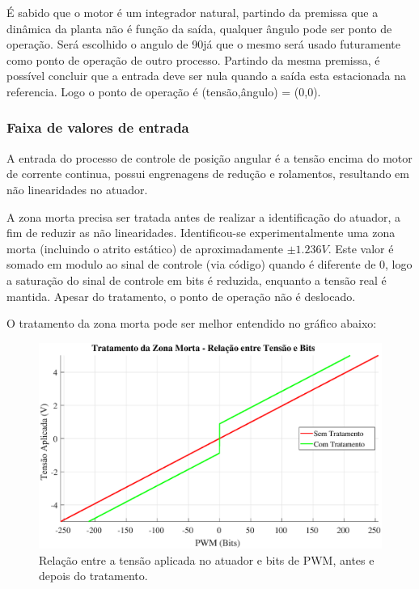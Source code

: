 \documentclass[conference,harvard,brazil,english]{sbatex}
\begin{document}
            É sabido que o motor é um integrador natural, partindo da premissa que a dinâmica da planta não é função da saída, qualquer ângulo pode ser ponto de operação. Será escolhido o angulo de 90\degree já que o mesmo será usado futuramente como ponto de operação de outro processo. Partindo da mesma premissa, é possível concluir que a entrada deve ser nula quando a saída esta estacionada na referencia. Logo o ponto de operação é (tensão,ângulo) = (0,0).
            
            \subsubsection{Faixa de valores de entrada}
                
                A entrada do processo de controle de posição angular é a tensão encima do motor de corrente continua, possui engrenagens de redução e rolamentos, resultando em não linearidades no atuador.
                
                A zona morta precisa ser tratada antes de realizar a identificação do atuador, a fim de reduzir as não linearidades. Identificou-se experimentalmente uma zona morta (incluindo o atrito estático) de aproximadamente $\pm 1.236V$. Este valor é somado em modulo ao sinal de controle (via código) quando é diferente de 0, logo a saturação do sinal de controle em bits é reduzida, enquanto a tensão real é mantida. Apesar do tratamento, o ponto de operação não é deslocado.
                
                O tratamento da zona morta pode ser melhor entendido no gráfico abaixo:
                 
                \begin{figure}[!htb] 
                \centering
                    \includegraphics[width=\columnwidth]{imagens/zonamorta.eps}{
                    \small
                    \centering
                    \caption{Relação entre a tensão aplicada no atuador e bits de PWM, antes e depois do tratamento.}
                    \label{ZonaMorta}}
                \end{figure}
                
\end{document}
